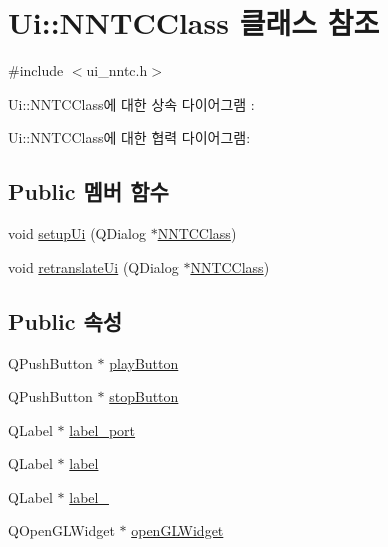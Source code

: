 \hypertarget{class_ui_1_1_n_n_t_c_class}{}\section{Ui\+:\+:N\+N\+T\+C\+Class 클래스 참조}
\label{class_ui_1_1_n_n_t_c_class}


{\ttfamily \#include $<$ui\+\_\+nntc.\+h$>$}



Ui\+:\+:N\+N\+T\+C\+Class에 대한 상속 다이어그램 \+: 


Ui\+:\+:N\+N\+T\+C\+Class에 대한 협력 다이어그램\+:
\subsection*{Public 멤버 함수}
\begin{DoxyCompactItemize}
\item 
void \mbox{\hyperlink{class_ui___n_n_t_c_class_af15085afc5bdbefb529321782b509792}{setup\+Ui}} (Q\+Dialog $\ast$\mbox{\hyperlink{class_ui_1_1_n_n_t_c_class}{N\+N\+T\+C\+Class}})
\item 
void \mbox{\hyperlink{class_ui___n_n_t_c_class_ad2695a3333b66339fde691ec8384d154}{retranslate\+Ui}} (Q\+Dialog $\ast$\mbox{\hyperlink{class_ui_1_1_n_n_t_c_class}{N\+N\+T\+C\+Class}})
\end{DoxyCompactItemize}
\subsection*{Public 속성}
\begin{DoxyCompactItemize}
\item 
Q\+Push\+Button $\ast$ \mbox{\hyperlink{class_ui___n_n_t_c_class_a6e604f467f5d7264f8d23f0cf54a6fdf}{play\+Button}}
\item 
Q\+Push\+Button $\ast$ \mbox{\hyperlink{class_ui___n_n_t_c_class_a748e190a62458531e66a574cc556e32d}{stop\+Button}}
\item 
Q\+Label $\ast$ \mbox{\hyperlink{class_ui___n_n_t_c_class_a81085bd25c14084fdec83b6527ad7a4c}{label\+\_\+port}}
\item 
Q\+Label $\ast$ \mbox{\hyperlink{class_ui___n_n_t_c_class_a4bb97de507bbb57b6d45f102b06a868f}{label}}
\item 
Q\+Label $\ast$ \mbox{\hyperlink{class_ui___n_n_t_c_class_ae5ebb132466c86f325d6030871f57b5c}{label\+\_}}
\item 
Q\+Open\+G\+L\+Widget $\ast$ \mbox{\hyperlink{class_ui___n_n_t_c_class_a6c33153ad1f40f7f704a54888abfd037}{open\+G\+L\+Widget}}
\end{DoxyCompactItemize}



